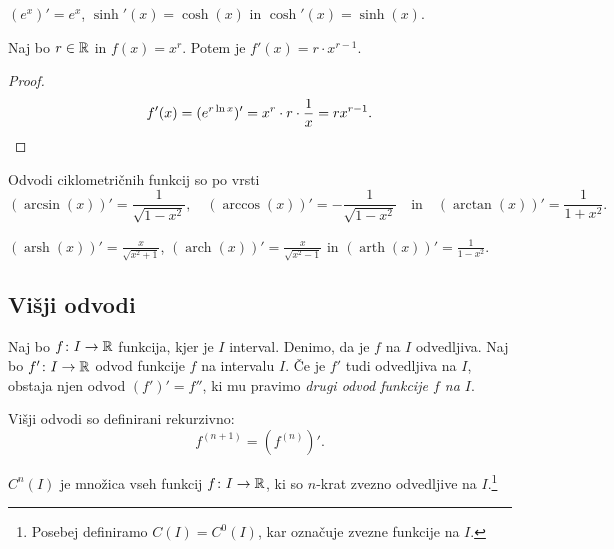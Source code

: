 \documentclass[12pt, a4paper]{article}
\begin{document}
\begin{posledica}
$(e^x)'=e^x$, $\sinh'(x)=\cosh(x)$ in $\cosh'(x)=\sinh(x)$.
\end{posledica}

\obvs

\begin{posledica}
Naj bo $r\in\mathbb{R}$ in $f(x)=x^r$. Potem je $f'(x)=r\cdot x^{r-1}$.
\end{posledica}

\begin{proof}
\[
f'(x)=(e^{r\ln x})'=x^r\cdot r\cdot\frac{1}{x}=rx^{r-1}.\qedhere
\]
\end{proof}

\begin{trditev}
Odvodi ciklometričnih funkcij so po vrsti
\[
(\arcsin(x))'=\frac{1}{\sqrt{1-x^2}},\quad (\arccos(x))'=-\frac{1}{\sqrt{1-x^2}}\quad\text{in}\quad (\arctan(x))'=\frac{1}{1+x^2}.
\]
\end{trditev}

\obvs

\begin{posledica}
$(\operatorname{arsh}(x))'=\frac{x}{\sqrt{x^2+1}}$, $(\operatorname{arch}(x))'=\frac{x}{\sqrt{x^2-1}}$ in $(\operatorname{arth}(x))'=\frac{1}{1-x^2}$.
\end{posledica}

\newpage

\subsection{Višji odvodi}

\begin{okvir}
\begin{definicija}
Naj bo $f\colon I\to\mathbb{R}$ funkcija, kjer je $I$ interval. Denimo, da je $f$ na $I$ odvedljiva. Naj bo $f'\colon I\to\mathbb{R}$ odvod funkcije $f$ na intervalu $I$. Če je $f'$ tudi odvedljiva na $I$, obstaja njen odvod $(f')'=f''$, ki mu pravimo \emph{drugi odvod funkcije $f$ na $I$}.

Višji odvodi so definirani rekurzivno:
\[
f^{(n+1)}=\left(f^{(n)}\right)'.
\]
\end{definicija}
\end{okvir}

\begin{definicija}
$C^n(I)$ je množica vseh funkcij $f\colon I\to\mathbb{R}$, ki so $n$-krat zvezno odvedljive na $I$.\footnote{Posebej definiramo $C(I)=C^0(I)$, kar označuje zvezne funkcije na $I$.}
\end{definicija}
\end{document}

